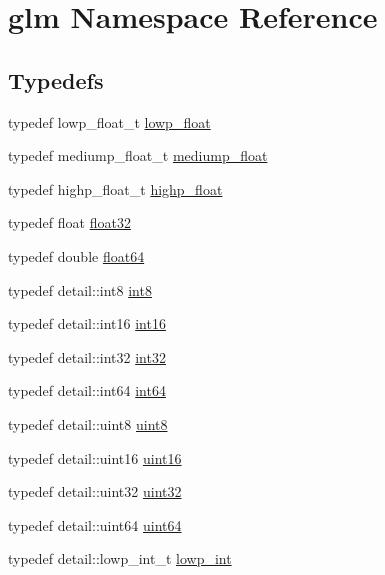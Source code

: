 \hypertarget{namespaceglm}{
\section{glm Namespace Reference}
\label{namespaceglm}
}


\subsection*{Typedefs}
\begin{CompactItemize}
\item 
typedef lowp\_\-float\_\-t \hyperlink{group__core__precision_g2887fbc729ac5c1c5caeb7cd57a7145c}{lowp\_\-float}
\item 
typedef mediump\_\-float\_\-t \hyperlink{group__core__precision_gc785826c039fe6c97c03b37c81c1a68e}{mediump\_\-float}
\item 
typedef highp\_\-float\_\-t \hyperlink{group__core__precision_g3d443a093adc053638ed7f81c5bfe300}{highp\_\-float}
\item 
typedef float \hyperlink{group__gtc__type__precision_g814f2f65354b6588b067cc5c67a6b340}{float32}
\item 
typedef double \hyperlink{group__gtc__type__precision_gb721f828b41f46b20cf4883b50733d3b}{float64}
\item 
typedef detail::int8 \hyperlink{group__gtc__type__precision_g96254f9c1c4506fc8eb5cf3301ce8565}{int8}
\item 
typedef detail::int16 \hyperlink{group__gtc__type__precision_g2945a61d12771f8954994fcddf02b021}{int16}
\item 
typedef detail::int32 \hyperlink{group__gtc__type__precision_g632d8b25f6b61659f39ea4321fab92a4}{int32}
\item 
typedef detail::int64 \hyperlink{group__gtc__type__precision_g435d75819cce297cc5fa21bd84ef89a5}{int64}
\item 
typedef detail::uint8 \hyperlink{group__gtc__type__precision_g1a7dcd8aac97cc8020817c94049deff2}{uint8}
\item 
typedef detail::uint16 \hyperlink{group__gtc__type__precision_gd8c2939e1fdd8e5828b31d95c52255d5}{uint16}
\item 
typedef detail::uint32 \hyperlink{group__gtc__type__precision_g202b6a53c105fcb7e531f9b443518451}{uint32}
\item 
typedef detail::uint64 \hyperlink{group__gtc__type__precision_ge3632bf9b37da66233d78930dd06378a}{uint64}
\item 
typedef detail::lowp\_\-int\_\-t \hyperlink{group__core__precision_g4681244bf4a184734f03aa9df4e3d288}{lowp\_\-int}

\end{CompactItemize}
